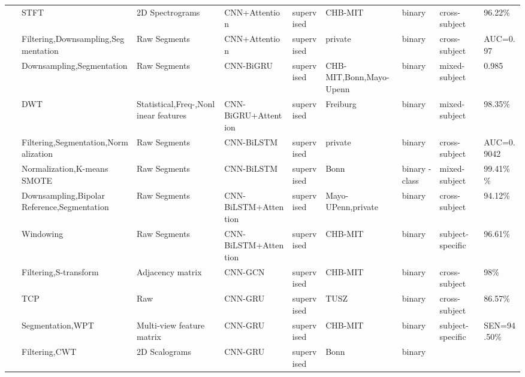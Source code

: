 \begin{table*}[ht]
\begin{tabular}{p{0.4cm}p{2.8cm}p{2cm}p{1.5cm}p{1.9cm}p{1.9cm}p{0.8cm}p{1.8cm}p{1.5cm}}
~\cite{Seizure106} & STFT & 2D Spectrograms & CNN+Attention & supervised & CHB-MIT & binary & cross-subject & 96.22\% \\
~\cite{Seizure107} & Filtering,Downsampling,\newline Segmentation & Raw Segments & CNN+Attention & supervised & private & binary & cross-subject & AUC=0.97 \\
~\cite{Seizure108} & Downsampling,\newline Segmentation & Raw Segments & CNN-BiGRU & supervised & CHB-MIT,\newline Bonn,\newline Mayo-Upenn & binary & mixed-subject & 0.985 \\
~\cite{Seizure109} & DWT & Statistical,Freq-,\newline Nonlinear features & CNN-BiGRU\newline +Attention & supervised & Freiburg & binary & mixed-subject & 98.35\% \\
~\cite{Seizure110} & Filtering,Segmentation,\newline Normalization & Raw Segments & CNN-BiLSTM & supervised & private & binary & cross-subject & AUC=0.9042 \\
~\cite{Seizure111} & Normalization,K-means SMOTE & Raw Segments & CNN-BiLSTM & supervised & Bonn & binary \newline
5-class & mixed-subject & 99.41\% \newline
84.10\% \\
~\cite{Seizure112} & Downsampling,Bipolar Reference,Segmentation & Raw Segments & CNN-BiLSTM\newline +Attention & supervised & Mayo-UPenn,\newline private & binary & cross-subject & 94.12\% \\
~\cite{dutta2024deep} & Windowing & Raw Segments & CNN-BiLSTM\newline +Attention & supervised & CHB-MIT & binary & subject-specific & 96.61\% \\
~\cite{Seizure114} & Filtering,S-transform & Adjacency matrix & CNN-GCN & supervised & CHB-MIT & binary & cross-subject & 98\% \\
 ~\cite{Seizure115} & TCP & Raw & CNN-GRU & supervised & TUSZ & binary & cross-subject & 86.57\% \\
~\cite{Seizure116} & Segmentation,WPT & Multi-view feature matrix & CNN-GRU & supervised & CHB-MIT & binary & subject-specific & SEN=94.50\% \\
~\cite{Seizure117} & Filtering,CWT & 2D Scalograms & CNN-GRU & supervised & Bonn & binary \newline

\end{tabular}
\end{table*}
